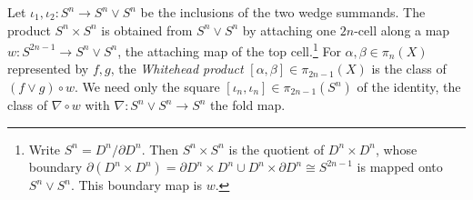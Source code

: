 Let $\iota_1,\iota_2\colon S^n\to S^n\vee S^n$ be the inclusions of the two wedge summands. The product $S^n\times S^n$ is obtained from $S^n\vee S^n$ by attaching one $2n$-cell along a map $w\colon S^{2n-1}\to S^n\vee S^n$, the attaching map of the top cell.\footnote{Write $S^n=D^n/\partial D^n$. Then $S^n\times S^n$ is the quotient of $D^n\times D^n$, whose boundary $\partial(D^n\times D^n)=\partial D^n\times D^n\cup D^n\times\partial D^n\cong S^{2n-1}$ is mapped onto $S^n\vee S^n$. This boundary map is $w$.} For $\alpha,\beta\in\pi_n(X)$ represented by $f,g$, the \emph{Whitehead product} $[\alpha,\beta]\in\pi_{2n-1}(X)$ is the class of $(f\vee g)\circ w$. We need only the square $[\iota_n,\iota_n]\in\pi_{2n-1}(S^n)$ of the identity, the class of $\nabla\circ w$ with $\nabla\colon S^n\vee S^n\to S^n$ the fold map.
